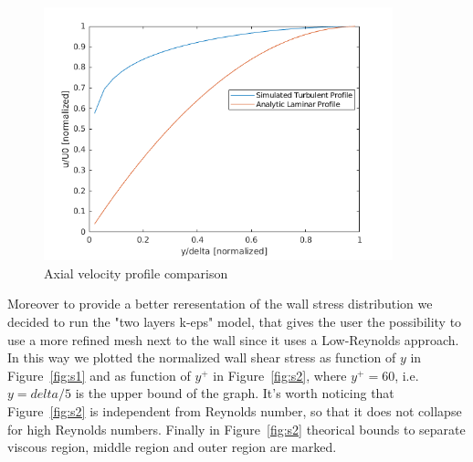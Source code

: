 \documentclass[12pt]{article}
\begin{document}
        \begin{figure}
                \centering
                \includegraphics[width=0.9\textwidth]{Axial_Velocities.png}
                \caption{Axial velocity profile comparison}
                \label{fig:axialV}
        \end{figure}
        
Moreover to provide a better reresentation of the wall stress distribution we decided to run the "two layers k-eps" model, that gives the user the possibility to use a more refined mesh next to the wall since it uses a Low-Reynolds approach. In this way we plotted the normalized wall shear stress as function of \(y\) in Figure~\ref{fig:s1} and as function of \( y^+ \) in Figure~\ref{fig:s2}, where \( y^+ =60 \), i.e.\( y =delta/5 \) is the upper bound of the graph. It's worth noticing that Figure~\ref{fig:s2} is independent from Reynolds number, so that it does not collapse for high Reynolds numbers. Finally in Figure~\ref{fig:s2} theorical bounds to separate viscous region, middle region and outer region are marked.
\end{document}
